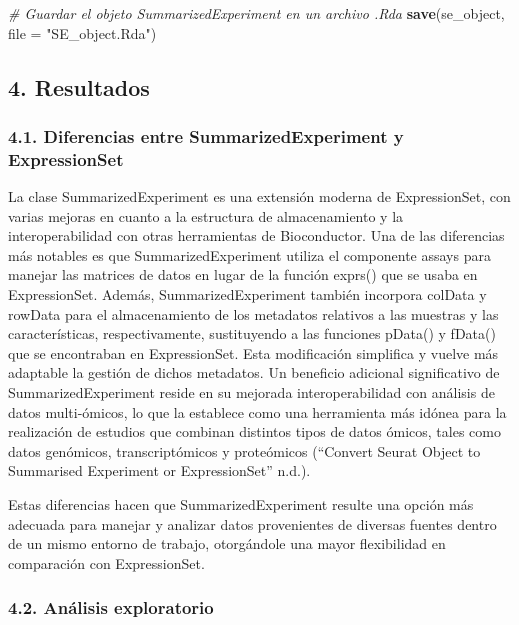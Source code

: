 \documentclass[
]{article}
\newenvironment{Shaded}{\begin{snugshade}}{\end{snugshade}}
\newcommand{\AttributeTok}[1]{\textcolor[rgb]{0.13,0.29,0.53}{#1}}
\newcommand{\CommentTok}[1]{\textcolor[rgb]{0.56,0.35,0.01}{\textit{#1}}}
\newcommand{\FunctionTok}[1]{\textcolor[rgb]{0.13,0.29,0.53}{\textbf{#1}}}
\newcommand{\NormalTok}[1]{#1}
\newcommand{\StringTok}[1]{\textcolor[rgb]{0.31,0.60,0.02}{#1}}
\begin{document}
\begin{Shaded}
\begin{Highlighting}[]
\CommentTok{\# Guardar el objeto SummarizedExperiment en un archivo .Rda}
\FunctionTok{save}\NormalTok{(se\_object, }\AttributeTok{file =} \StringTok{"SE\_object.Rda"}\NormalTok{)}
\end{Highlighting}
\end{Shaded}

\subsection{4. Resultados}\label{resultados}

\subsubsection{4.1. Diferencias entre SummarizedExperiment y
ExpressionSet}\label{diferencias-entre-summarizedexperiment-y-expressionset}

La clase SummarizedExperiment es una extensión moderna de ExpressionSet,
con varias mejoras en cuanto a la estructura de almacenamiento y la
interoperabilidad con otras herramientas de Bioconductor. Una de las
diferencias más notables es que SummarizedExperiment utiliza el
componente assays para manejar las matrices de datos en lugar de la
función exprs() que se usaba en ExpressionSet. Además,
SummarizedExperiment también incorpora colData y rowData para el
almacenamiento de los metadatos relativos a las muestras y las
características, respectivamente, sustituyendo a las funciones pData() y
fData() que se encontraban en ExpressionSet. Esta modificación
simplifica y vuelve más adaptable la gestión de dichos metadatos. Un
beneficio adicional significativo de SummarizedExperiment reside en su
mejorada interoperabilidad con análisis de datos multi-ómicos, lo que la
establece como una herramienta más idónea para la realización de
estudios que combinan distintos tipos de datos ómicos, tales como datos
genómicos, transcriptómicos y proteómicos ({``Convert {Seurat Object} to
{Summarised Experiment} or {ExpressionSet}''} n.d.).

Estas diferencias hacen que SummarizedExperiment resulte una opción más
adecuada para manejar y analizar datos provenientes de diversas fuentes
dentro de un mismo entorno de trabajo, otorgándole una mayor
flexibilidad en comparación con ExpressionSet.

\subsubsection{4.2. Análisis
exploratorio}\label{anuxe1lisis-exploratorio}
\end{document}
